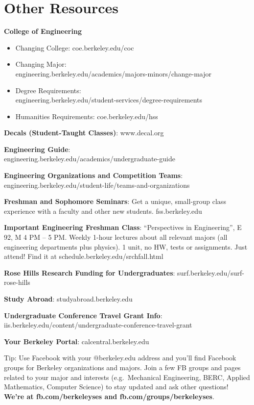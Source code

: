 \chapter*{Other Resources}

\textbf{College of Engineering}
\begin{itemize}
  \item Changing College: {\selectfont coe.berkeley.edu/coc}
  \item Changing Major: \\
    {\selectfont engineering.berkeley.edu/academics/majors-minors/change-major} 
  \item Degree Requirements: \\
    {\selectfont engineering.berkeley.edu/student-services/degree-requirements} 
  \item Humanities Requirements: {\selectfont coe.berkeley.edu/hss} 
\end{itemize}

\textbf{Decals (Student-Taught Classes)}: {\selectfont www.decal.org} 
    
\textbf{Engineering Guide}: \\
{\selectfont engineering.berkeley.edu/academics/undergraduate-guide}

\textbf{Engineering Organizations and Competition Teams}: \\
{\selectfont engineering.berkeley.edu/student-life/teams-and-organizations}

\textbf{Freshman and Sophomore Seminars}: Get a unique, small-group class experience with a faculty and other new students. {\selectfont fss.berkeley.edu}

\textbf{Important Engineering Freshman Class}: “Perspectives in Engineering”, E 92, M 4 PM – 5 PM. Weekly 1-hour lectures about all relevant majors (all engineering departments plus physics). 1 unit, no HW, tests or assignments. Just attend! Find it at {\selectfont schedule.berkeley.edu/srchfall.html} 

\textbf{Rose Hills Research Funding for Undergraduates}:
{\selectfont surf.berkeley.edu/surf-rose-hills}

\textbf{Study Abroad}: {\selectfont studyabroad.berkeley.edu} 

\textbf{Undergraduate Conference Travel Grant Info}: \\
{\selectfont iis.berkeley.edu/content/undergraduate-conference-travel-grant}

\textbf{Your Berkeley Portal}: {\selectfont calcentral.berkeley.edu} 

Tip: Use Facebook with your {\selectfont @berkeley.edu} address and you’ll find Facebook groups for Berkeley organizations and majors. Join a few FB groups and pages related to your major and interests (e.g.\ Mechanical Engineering, BERC, Applied Mathematics, Computer Science) to stay updated and ask other questions! \textbf{We’re at {\selectfont fb.com/berkeleyses} and {\selectfont fb.com/groups/berkeleyses}}.

